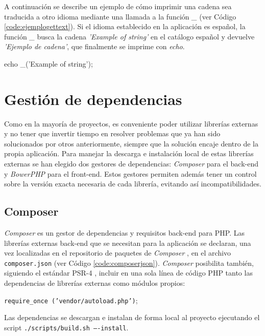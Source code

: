 A continuación se describe un ejemplo de cómo imprimir una cadena sea traducida a otro idioma mediante una llamada a la función \textit{\_} (ver Código \ref{code:ejemplogettext}). Si el idioma establecido en la aplicación es español, la función \textit{\_} busca la cadena \textit{'Example of string'} en el catálogo español y devuelve \textit{'Ejemplo de cadena'}, que finalmente se imprime con \textit{echo}.

\begin{code}[label=code:ejemplogettext,language=php,caption=Ejemplo de traducción con la librería \textit{gettext}]
echo _('Example of string');
\end{code}


\section{Gestión de dependencias\label{extra:mvc:dependencias}}

Como en la mayoría de proyectos, es conveniente poder utilizar librerías externas y no tener que invertir tiempo en resolver problemas que ya han sido solucionados por otros anteriormente, siempre que la solución encaje dentro de la propia aplicación. Para manejar la descarga e instalación local de estas librerías externas se han elegido dos gestores de dependencias: \textit{Composer} \cite{composer} para el \gls{back-end} y \textit{BowerPHP} \cite{bowerphp} para el \gls{front-end}. Estos gestores permiten además tener un control sobre la versión exacta necesaria de cada librería, evitando así incompatibilidades.

\subsection*{Composer\label{extra:mvc:composer}}

\textit{Composer} es un gestor de dependencias y requisitos \gls{back-end} para \gls{PHP}. Las librerías externas \gls{back-end} que se necesitan para la aplicación se declaran, una vez localizadas en el repositorio de paquetes de \textit{Composer} \cite{composerrepositorio}, en el archivo \texttt{composer.json} (ver Código \ref{code:composerjson}). \textit{Composer} posibilita también, siguiendo el estándar PSR-4 \cite{psr4}, incluir en una sola línea de código \gls{PHP} tanto las dependencias de librerías externas como módulos propios:

\texttt{require\_once ('vendor/autoload.php')};

Las dependencias se descargan e instalan de forma local al proyecto ejecutando el \gls{script} \texttt{./scripts/build.sh ----install}.

